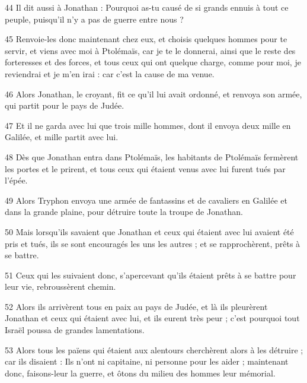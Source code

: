\par 44 Il dit aussi à Jonathan : Pourquoi as-tu causé de si grands ennuis à tout ce peuple, puisqu'il n'y a pas de guerre entre nous ?
\par 45 Renvoie-les donc maintenant chez eux, et choisis quelques hommes pour te servir, et viens avec moi à Ptolémaïs, car je te le donnerai, ainsi que le reste des forteresses et des forces, et tous ceux qui ont quelque charge, comme pour moi, je reviendrai et je m'en irai : car c'est la cause de ma venue.
\par 46 Alors Jonathan, le croyant, fit ce qu'il lui avait ordonné, et renvoya son armée, qui partit pour le pays de Judée.
\par 47 Et il ne garda avec lui que trois mille hommes, dont il envoya deux mille en Galilée, et mille partit avec lui.
\par 48 Dès que Jonathan entra dans Ptolémaïs, les habitants de Ptolémaïs fermèrent les portes et le prirent, et tous ceux qui étaient venus avec lui furent tués par l'épée.
\par 49 Alors Tryphon envoya une armée de fantassins et de cavaliers en Galilée et dans la grande plaine, pour détruire toute la troupe de Jonathan.
\par 50 Mais lorsqu'ils savaient que Jonathan et ceux qui étaient avec lui avaient été pris et tués, ils se sont encouragés les uns les autres ; et se rapprochèrent, prêts à se battre.
\par 51 Ceux qui les suivaient donc, s'apercevant qu'ils étaient prêts à se battre pour leur vie, rebroussèrent chemin.
\par 52 Alors ils arrivèrent tous en paix au pays de Judée, et là ils pleurèrent Jonathan et ceux qui étaient avec lui, et ils eurent très peur ; c'est pourquoi tout Israël poussa de grandes lamentations.
\par 53 Alors tous les païens qui étaient aux alentours cherchèrent alors à les détruire ; car ils disaient : Ils n'ont ni capitaine, ni personne pour les aider ; maintenant donc, faisons-leur la guerre, et ôtons du milieu des hommes leur mémorial.


